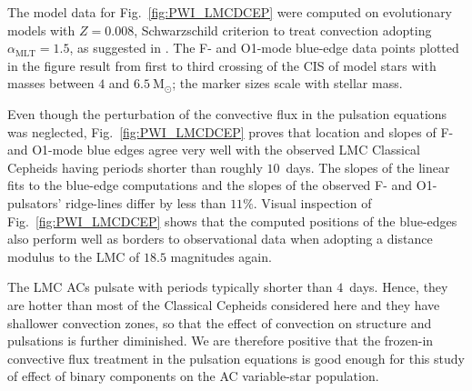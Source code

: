 \documentclass[a4paper,fleqn,usenatbib]{mnras}
\newcommand{\msol}{~\mathrm{M}_\odot}
\begin{document}
The model data for Fig.~\ref{fig:PWI_LMCDCEP} were computed on evolutionary models 
with $Z=0.008$, Schwarzschild criterion to treat convection adopting 
$\alpha_{\mathrm{MLT}}=1.5$, as suggested in \citet{Baraffe1998}. 
The F- and O1-mode blue-edge data points plotted in the figure result 
from first to third crossing of the CIS of model stars with masses 
between $4$ and $6.5 \msol$; the marker sizes scale with stellar mass. 

Even though the perturbation of the convective flux in the 
pulsation equations was neglected, Fig.~\ref{fig:PWI_LMCDCEP} proves that location and 
slopes of F- and O1-mode blue edges agree very well with the observed 
LMC Classical Cepheids having periods shorter than
roughly $10$~days. The slopes of the linear fits to the blue-edge computations
and the slopes of the observed F- and O1-pulsators' 
ridge-lines differ by less than $11 \%$. 
Visual inspection of Fig.~\ref{fig:PWI_LMCDCEP} shows that the
computed positions of the blue-edges also perform well as borders to
observational data when adopting a distance modulus to the LMC of $18.5$ magnitudes again.  

The LMC ACs pulsate with periods typically shorter than $4$~days. Hence, 
they are hotter than most of the Classical Cepheids considered here and 
they have shallower convection zones, so that the effect of convection on structure
and pulsations is further diminished. We are therefore positive that the 
frozen-in convective flux treatment in the pulsation equations is good 
enough for this study of effect of binary components on the AC 
variable-star population. 
 
\bsp	%
\label{lastpage}
\end{document}
